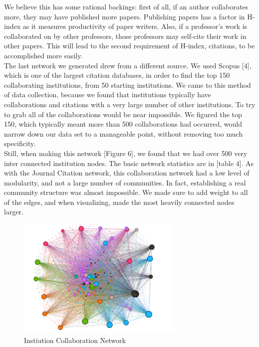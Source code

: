 \documentclass[times, 10pt,twocolumn]{article}
\begin{document}
We believe this has some rational backings: first of all, if an author collaborates more, they may have published more papers. Publishing papers has a factor in H-index as it measures productivity of paper writers. Also, if a professor’s work is collaborated on by other professors, those professors may self-cite their work in other papers. This will lead to the second requirement of H-index, citations, to be accomplished more easily. \\

The last network we generated drew from a different source. We used Scopus [4], which is one of the largest citation databases, in order to find the top 150 collaborating institutions, from 50 starting institutions. We came to this method of data collection, because we found that institutions typically have collaborations and citations with a very large number of other institutions. To try to grab all of the collaborations would be near impossible. We figured the top 150, which typically meant more than 500 collaborations had occurred, would narrow down our data set to a manageable point, without removing too much specificity. \\

Still, when making this network [Figure 6], we found that we had over 500 very inter connected institution nodes. The basic network statistics are in [table 4]. As with the Journal Citation network, this collaboration network had a low level of modularity, and not a large number of communities. In fact, establishing a real community structure was almost impossible. We made sure to add weight to all of the edges, and when visualizing, made the most heavily connected nodes larger. \\

\begin{figure}[h]
   \includegraphics[width=8cm]{figure6.png}
   \caption{Instiution Collaboration Network}
\end{figure}
\end{document}
